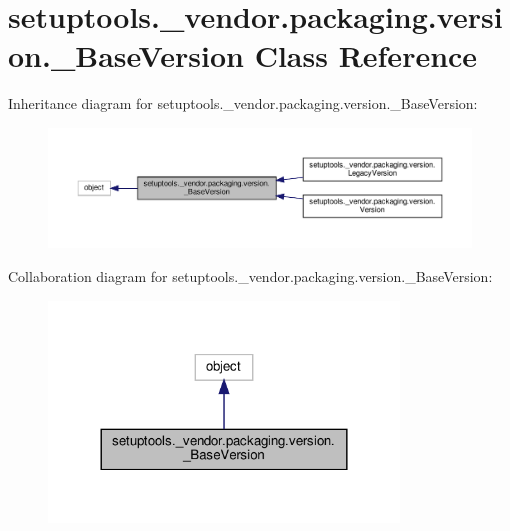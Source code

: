 \hypertarget{classsetuptools_1_1__vendor_1_1packaging_1_1version_1_1__BaseVersion}{}\section{setuptools.\+\_\+vendor.\+packaging.\+version.\+\_\+\+Base\+Version Class Reference}
\label{classsetuptools_1_1__vendor_1_1packaging_1_1version_1_1__BaseVersion}


Inheritance diagram for setuptools.\+\_\+vendor.\+packaging.\+version.\+\_\+\+Base\+Version\+:
\nopagebreak
\begin{figure}[H]
\begin{center}
\leavevmode
\includegraphics[width=350pt]{classsetuptools_1_1__vendor_1_1packaging_1_1version_1_1__BaseVersion__inherit__graph}
\end{center}
\end{figure}


Collaboration diagram for setuptools.\+\_\+vendor.\+packaging.\+version.\+\_\+\+Base\+Version\+:
\nopagebreak
\begin{figure}[H]
\begin{center}
\leavevmode
\includegraphics[width=264pt]{classsetuptools_1_1__vendor_1_1packaging_1_1version_1_1__BaseVersion__coll__graph}
\end{center}
\end{figure}
